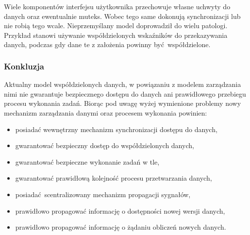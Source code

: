 Wiele komponentów interfejsu użytkownika przechowuje własne uchwyty do danych oraz ewentualnie muteks. Wobec tego same dokonują synchronizacji lub nie robią tego wcale. Nieprzemyślany model doprowadził do wielu patologi. Przykład stanowi używanie współdzielonych wskaźników do przekazywania danych, podczas gdy dane te z założenia powinny być współdzielone.

\subsubsection{Konkluzja}

Aktualny model współdzielonych danych, w powiązaniu z modelem zarządzania nimi nie gwarantuje bezpiecznego dostępu do danych ani prawidłowego przebiegu procesu wykonania zadań. Biorąc pod uwagę wyżej wymienione problemy nowy mechanizm zarządzania danymi oraz procesem wykonania powinien: 
\begin{itemize}
	\item posiadać wewnętrzny mechanizm synchronizacji dostępu do danych,
	\item gwarantować bezpieczny dostęp do współdzielonych danych,
	\item gwarantować bezpieczne wykonanie zadań w tle,
	\item gwarantować prawidłową kolejność procesu przetwarzania danych,
	\item posiadać scentralizowany mechanizm propagacji sygnałów,
	\item prawidłowo propagować informację o dostępności nowej wersji danych,
	\item prawidłowo propagować informację o żądaniu obliczeń nowych danych.
\end{itemize}





